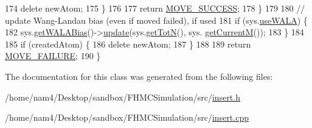 \begin{DoxyCode}
174             \textcolor{keyword}{delete} newAtom;
175         \}
176 
177             \textcolor{keywordflow}{return} \hyperlink{moves_8h_ae8285cbddc5d21f73f49dcbad82a775a}{MOVE\_SUCCESS};
178         \}
179 
180     \textcolor{comment}{// update Wang-Landau bias (even if moved failed), if used}
181     \textcolor{keywordflow}{if} (sys.\hyperlink{classsim_system_aa83b00006b3919fb6e13f1bdeadece6a}{useWALA}) \{
182         sys.\hyperlink{classsim_system_a7cb5049de8b0988349e89e30e4000407}{getWALABias}()->\hyperlink{classwala_ab439e3f60bea6c54522a870b9ad67acf}{update}(sys.\hyperlink{classsim_system_a37dd827f4057049763351510147b9f1d}{getTotN}(), sys.
      \hyperlink{classsim_system_a299fe4372e610b554eaaf5f5957b2dbc}{getCurrentM}());
183     \}
184 
185     \textcolor{keywordflow}{if} (createdAtom) \{
186         \textcolor{keyword}{delete} newAtom;
187     \}
188 
189     \textcolor{keywordflow}{return} \hyperlink{moves_8h_a9832cf5fcfa8c0894545b591c9908e39}{MOVE\_FAILURE};
190 \}
\end{DoxyCode}


The documentation for this class was generated from the following files\-:\begin{DoxyCompactItemize}
\item 
/home/nam4/\-Desktop/sandbox/\-F\-H\-M\-C\-Simulation/src/\hyperlink{insert_8h}{insert.\-h}\item 
/home/nam4/\-Desktop/sandbox/\-F\-H\-M\-C\-Simulation/src/\hyperlink{insert_8cpp}{insert.\-cpp}\end{DoxyCompactItemize}
